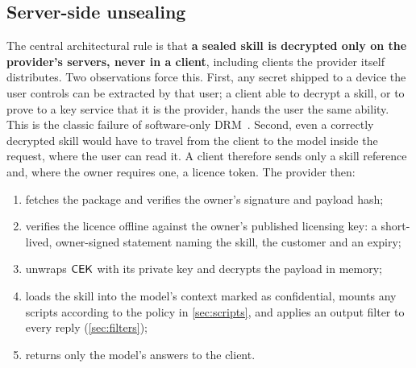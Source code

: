 \subsection{Server-side unsealing}
\label{sec:boundary}
The central architectural rule is that \textbf{a sealed skill is decrypted only on the provider's
servers, never in a client}, including clients the provider itself distributes. Two observations
force this. First, any secret shipped to a device the user controls can be extracted by that user;
a client able to decrypt a skill, or to prove to a key service that it is the provider, hands the
user the same ability. This is the classic failure of software-only DRM~\citep{biddle2003darknet}.
Second, even a correctly decrypted skill would have to travel from the client to the model inside
the request, where the user can read it. A client therefore sends only a skill reference and,
where the owner requires one, a licence token. The provider then:
\begin{enumerate}
  \item fetches the package and verifies the owner's signature and payload hash;
  \item verifies the licence offline against the owner's published licensing key: a short-lived,
  owner-signed statement naming the skill, the customer and an expiry;
  \item unwraps $\mathsf{CEK}$ with its private key and decrypts the payload in memory;
  \item loads the skill into the model's context marked as confidential, mounts any scripts
  according to the policy in \cref{sec:scripts}, and applies an output filter to every reply
  (\cref{sec:filters});
  \item returns only the model's answers to the client.
\end{enumerate}

